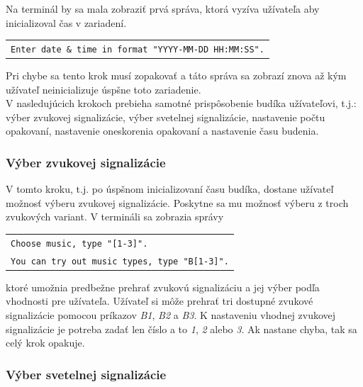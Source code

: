 \documentclass[11pt,a4paper]{article}
\begin{document}
        \indent Na terminál by sa mala zobraziť prvá správa, ktorá vyzíva užívateľa aby inicializoval čas v zariadení. 
        \begin{center}
            \begin{tabular}{l}
                \texttt{Enter date \& time in format "YYYY-MM-DD HH:MM:SS".}
            \end{tabular}
        \end{center}
        Pri chybe sa tento krok musí zopakovať a táto správa sa zobrazí znova až kým užívateľ neinicializuje úspšne toto zariadenie.\\

        \indent V nasledujúcich krokoch prebieha samotné prispôsobenie budíka užívateľovi, t.j.: výber zvukovej signalizácie, výber svetelnej signalizácie, nastavenie počtu opakovaní, nastavenie oneskorenia opakovaní a nastavenie času budenia.

        \subsubsection{Výber zvukovej signalizácie}

            \indent V tomto kroku, t.j. po úspšnom inicializovaní času budíka, dostane užívateľ možnosť výberu zvukovej signalizácie. Poskytne sa mu možnosť výberu z troch zvukových variant. V termináli sa zobrazia správy
            \begin{center}
                \begin{tabular}{l}
                    \texttt{Choose music, type "[1-3]".}\\
                    \texttt{You can try out music types, type "B[1-3]".}
                \end{tabular}
            \end{center}
            ktoré umožnia predbežne prehrať zvukovú signalizáciu a jej výber podľa vhodnosti pre užívateľa. Užívateľ si môže prehrať tri dostupné zvukové signalizácie pomocou príkazov \textit{B1}, \textit{B2} a \textit{B3}. K nastaveniu vhodnej zvukovej signalizácie je potreba zadať len číslo a to \textit{1}, \textit{2} alebo \textit{3}. Ak nastane chyba, tak sa celý krok opakuje.

        \subsubsection{Výber svetelnej signalizácie}
\end{document}

